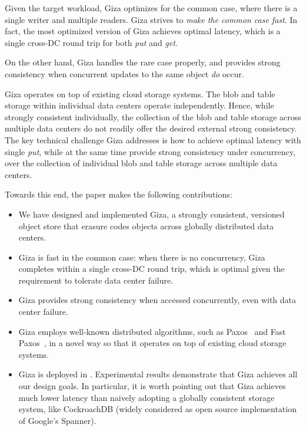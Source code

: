 Given the target workload, Giza optimizes for the common case, where there is
a single writer and multiple readers. Giza strives to {\em make the common case
fast}. In fact, the most optimized version of Giza achieves optimal latency,
which is a single cross-DC round trip for both {\em put} and {\em get}.

On the other hand, Giza handles the rare case properly,
and provides strong consistency when concurrent updates to the same object {\em do} occur.

Giza operates on top of existing cloud storage systems. 
The blob and table storage within individual data centers operate independently.
Hence, while strongly consistent individually, the collection of the blob and
table storage across multiple data centers do not readily offer the desired
external strong consistency. The key technical challenge Giza addresses is how to achieve
optimal latency with single {\em put}, while at the same time provide
strong consistency under concurrency, over the collection of individual blob and
table storage across multiple data centers.

Towards this end, the paper makes the following contributions:
\begin{itemize}
    \item We have designed and implemented Giza, a strongly consistent,
      versioned object store that erasure codes objects across globally
      distributed data centers.
    \item Giza is fast in the common case: when there is no concurrency, Giza
      completes within a single cross-DC round trip, which is optimal given the
      requirement to tolerate data center failure.
    \item Giza provides strong consistency when accessed concurrently, even with data center
      failure.
    \item Giza employs well-known distributed algorithms, such as Paxos~\cite{lamport01paxos}
      and Fast Paxos~\cite{lamport05fast}, in a novel way so that it operates on top of existing cloud storage
      systems.
    \item Giza is deployed in \deployment. Experimental results demonstrate
      that Giza achieves all our design goals. In particular, it is worth
      pointing out that Giza achieves much lower latency than naively adopting a
      globally consistent storage system, like CockroachDB (widely considered as open source
      implementation of Google's Spanner).
\end{itemize}
